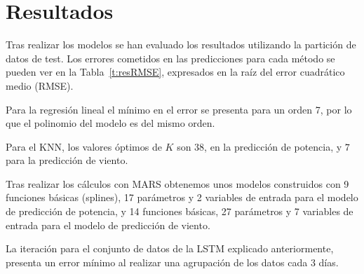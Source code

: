 \documentclass[journal]{IEEEtran}
\begin{document}
%
%

\section{Resultados} 
Tras realizar los modelos se han evaluado los resultados utilizando la partición de datos de test. Los errores cometidos en las predicciones para cada método se pueden ver en la Tabla~\ref{t:resRMSE}, expresados en la raíz del error cuadrático medio (RMSE).

Para la regresión lineal el mínimo en el error se presenta para un orden 7, por lo que el polinomio del modelo es del mismo orden.

Para el KNN, los valores óptimos de $K$ son $38$, en la predicción de potencia, y $7$ para la predicción de viento.

Tras realizar los cálculos con MARS obtenemos unos modelos construidos con 9 funciones básicas (splines), 17 parámetros  y 2 variables de entrada para el modelo de predicción de potencia, y 14 funciones básicas, 27 parámetros y 7 variables de entrada para el modelo de predicción de viento.

La iteración para el conjunto de datos de la LSTM explicado anteriormente, presenta un error mínimo al realizar una agrupación de los datos cada 3 días.
\end{document}
